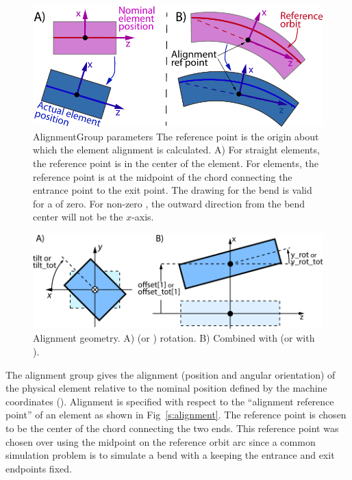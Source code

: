\begin{figure}
\centering \includegraphics{alignment-ref.pdf} 
\caption[Element alignment.]  
{AlignmentGroup parameters The reference point is the origin
about which the element alignment is calculated. 
A) For straight elements, the reference point is in the center of the element. 
For  elements, the reference point is at the midpoint of the chord connecting
the entrance point to the exit point. The drawing for the bend is valid for a 
of zero. For non-zero , the outward direction from the bend center will not be
the $x$-axis. 
}  \label{f:alignment}
\end{figure}

\begin{figure}
\centering \includegraphics{alignment2.pdf} \caption[Alignment geometry.]  
{Alignment geometry. A)  (or ) rotation. B) Combined
 with  (or  with ).
}  \label{f:alignment}
\end{figure}

The alignment group gives the alignment (position and angular orientation) of the physical element 
relative to the nominal position defined by the machine coordinates ().
Alignment is specified with respect to the ``alignment reference point'' of an element as shown
in Fig~\ref{s:alignment}. The  reference point is chosen to be the center of the chord
connecting the two ends. 
This reference point was chosen over using the midpoint on the reference orbit arc since a 
common simulation problem is to simulate a bend with a  keeping the entrance and exit
endpoints fixed.

